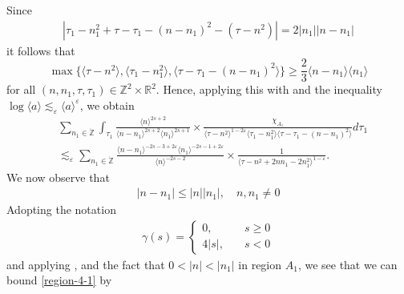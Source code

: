 \documentclass[12pt,reqno]{amsart}
\numberwithin{equation}{section}  %
\renewcommand{\cref}{\Cref}
\newcommand{\rr}{\mathbb{R}}
\newcommand{\zz}{\mathbb{Z}}
\newcommand{\zzdot}{\dot{\zz}}
\newcommand{\ee}{\varepsilon}
\begin{document}
%
Since
%
%
\begin{equation*}
\begin{split}
  | \tau_{1} - n_{1}^{2} + \tau - \tau_{1} - (n - n_{1})^{2} - (\tau - n^{2}) | = 2| n_{1} || n - n_{1} |
\end{split}
\end{equation*}
%
it follows that 
\[
\max\{\langle \tau - n^{2} \rangle , \langle \tau_{1} - n_{1}^{2} \rangle, \langle \tau - \tau_{1} - (n - n_{1})^{2} \rangle    \} \ge \frac{2}{3} \langle n - n_{1} \rangle \langle n_{1} \rangle 
\]
for all $(n, n_{1}, \tau, \tau_{1}) \in \zz^{2} \times \rr^{2}$.
Hence, applying this with \cref{lem:calc} and the inequality
$\log \langle a \rangle  \lesssim_{\ee} \langle a \rangle ^{\ee}$,
we obtain
%
%
%
%
%
%
%
%
%
%
%
%
%
%
\begin{equation}
  \label{region-4-1}
\begin{split}
 & \sum_{n_{1} \in \zzdot} \int_{\tau_{1}} \frac{\langle n \rangle ^{2s+2}}{\langle n - n_{1}\rangle ^{2s+2} \langle n_{1} \rangle^{2s+1}}  \times \frac{\chi_{A_{1}}}{\langle \tau - n^{2} \rangle^{1- 2 \ee} \langle
      \tau_{1} - n_{1}^{2} \rangle  \langle \tau - \tau_{1} - (n - n_{1})^{2} \rangle} d \tau_{1}
  \\
  &  \lesssim_{\ee} \sum_{n_{1} \in \zzdot} \frac{\langle n - n_{1} \rangle ^{-2s-3 + 2 \ee} \langle n_{1} \rangle ^{-2s -1 + 2\ee}}{\langle
    n\rangle ^{-2s -2}} \times \frac{1}{\langle
    \tau - n^{2} + 2nn_{1} -2n_{1}^{2} \rangle^{1 - \ee}}.
      \end{split}
\end{equation}
%
We now observe that
%
%
  \begin{equation*}
  \label{djk}
  \begin{split}
    | n - n_{1} | \le | n | | n_{1}|, \quad n, n_{1} \neq 0
  \end{split}
  \end{equation*}
%
%
%
%
%
%
%
Adopting the notation
  \begin{equation*}
  \begin{split}
  \gamma(s) = 
  \begin{cases} 0, \quad & s \ge 0
    \\
    4|s|, \quad & s < 0
  \end{cases}
\end{split}
  \end{equation*}
  and applying \cref{djk}, and the fact that 
  $0 < | n | < | n_{1} |$ in region $A_{1}$, we see that we can bound \eqref{region-4-1} by
\end{document}
